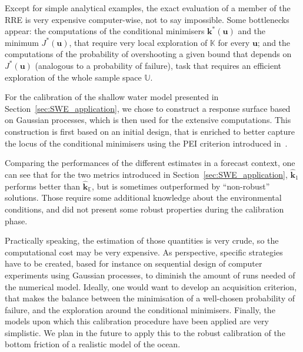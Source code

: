 \documentclass[preprint, 1p]{elsarticle}
\newcommand{\Ex}{\mathbb{E}}
\newcommand{\hatkmean}{\hat{\mathbf{k}}_{\Ex}}
\newcommand{\kest}{\hat{\mathbf{k}}}
\newcommand{\RRE}{RRE}
\newcommand{\Kspace}{\mathbb{K}}
\newcommand{\Uspace}{\mathbb{U}}
\newcommand{\victor}[1]{{\itshape\color{green} ({#1})}}
\begin{document}
Except for simple analytical examples, the exact evaluation of a member of the \RRE{} is very expensive computer-wise, not to say impossible. Some bottlenecks appear: the computations of the conditional minimisers $\mathbf{k}^*(\mathbf{u})$ and the minimum $J^*(\mathbf{u})$, that require very local exploration of $\Kspace$ for every $\mathbf{u}$; and the computations of the probability of overshooting a given bound that depends on $J^*(\mathbf{u})$ (analogous to a probability of failure), task that requires an efficient exploration of the whole sample space $\Uspace$.

For the calibration of the shallow water model presented in Section~\ref{sec:SWE_application}, we chose to construct a response surface based on Gaussian processes, which is then used for the extensive computations. This construction is first based on an initial design, that is enriched to better capture the locus of the conditional minimisers using the PEI criterion introduced in~\cite{ginsbourger_bayesian_2014}. 

Comparing the performances of the different estimates in a forecast context, one can see that for the two metrics introduced in Section~\ref{sec:SWE_application}, $\kest_1$ performs better than $\hatkmean$, but is sometimes outperformed by ``non-robust'' solutions. Those require some additional knowledge about the environmental conditions, and did not present some robust properties during the calibration phase.

Practically speaking, the estimation of those quantities is very crude, so the computational cost may be very expensive. As perspective, specific strategies have to be created, based for instance on sequential design of computer experiments using Gaussian processes, to diminish the amount of runs needed of the numerical model. Ideally, one would want to develop an acquisition criterion, that makes the balance between the minimisation of a well-chosen probability of failure, and the exploration around the conditional minimisers.
Finally, the models upon which this calibration procedure have been applied are very simplistic. We plan in the future to apply this to the robust calibration of the bottom friction of a realistic model of the ocean.

\end{document}
